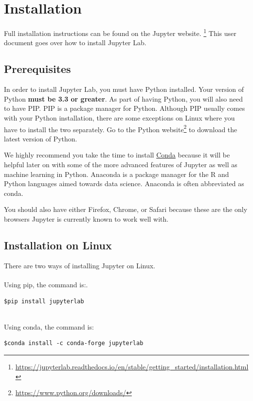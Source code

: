 \documentclass[pdftex,12pt]{artikel3}
\begin{document}
\section{Installation}

Full installation instructions can be found on the Jupyter website. \footnote{\url{ https://jupyterlab.readthedocs.io/en/stable/getting_started/installation.html}} This user document goes over how to install Jupyter Lab.

\subsection{Prerequisites}
In order to install Jupyter Lab, you must have Python installed. Your version of Python \textbf{must be 3.3 or greater}. 
As part of having Python, you will also need to have PIP.
PIP is a package manager for Python. 
Although PIP usually comes with your Python installation, there are some exceptions on Linux where you have to install the two separately.
Go to the Python website\footnote{\url{ https://www.python.org/downloads/}} to download the latest version of Python.


We highly recommend you take the time to install \href{https://docs.conda.io/projects/conda/en/latest/user-guide/install/}{Conda} because it will be helpful later on with some of the more advanced features of Jupyter as well as machine learning in Python.
Anaconda is a package manager for the R and Python languages aimed towards data science.
Anaconda is often abbreviated as conda. 


You should also have either Firefox, Chrome, or Safari because these are the only browsers Jupyter is currently known to work well with.

\subsection{Installation on Linux}
There are two ways of installing Jupyter on Linux.\\
\\
Using pip, the command is:.\\
\begin{lstlisting}
$pip install jupyterlab
\end{lstlisting}

\\
Using conda, the command is:
\begin{lstlisting}
$conda install -c conda-forge jupyterlab
\end{lstlisting}
\end{document}
